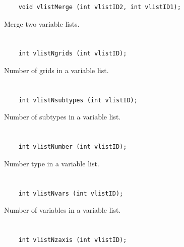 \begin{verbatim}
    void vlistMerge (int vlistID2, int vlistID1);
\end{verbatim}

Merge two variable lists.


\section*{\tt {}}

\begin{verbatim}
    int vlistNgrids (int vlistID);
\end{verbatim}

Number of grids in a variable list.


\section*{\tt {}}

\begin{verbatim}
    int vlistNsubtypes (int vlistID);
\end{verbatim}

Number of subtypes in a variable list.


\section*{\tt {}}

\begin{verbatim}
    int vlistNumber (int vlistID);
\end{verbatim}

Number type in a variable list.


\section*{\tt {}}

\begin{verbatim}
    int vlistNvars (int vlistID);
\end{verbatim}

Number of variables in a variable list.


\section*{\tt {}}

\begin{verbatim}
    int vlistNzaxis (int vlistID);
\end{verbatim}

